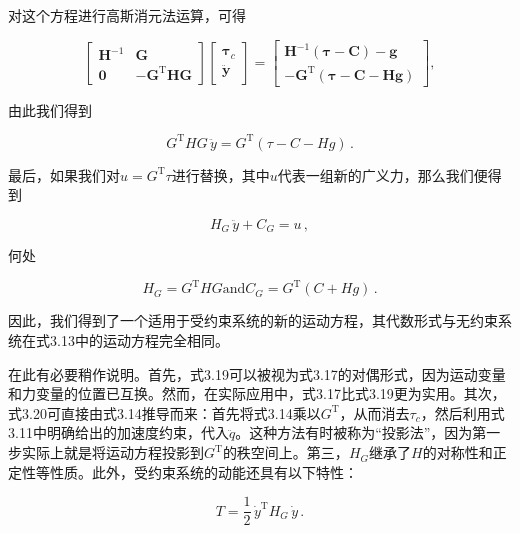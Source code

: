 \documentclass[10pt,a4paper]{book}
\theoremstyle{thmstyle} %
\theoremstyle{defstyle} %
\theoremstyle{prostyle} %
\begin{document}
对这个方程进行高斯消元法运算，可得



$$
\begin{bmatrix}\boldsymbol{H}^{-1}&\boldsymbol{G}\\\boldsymbol{0}&-\boldsymbol{G}^{\mathrm{T}}\boldsymbol{HG}\end{bmatrix}\begin{bmatrix}\boldsymbol{\tau}_{c}\\\ddot{\boldsymbol{y}}\end{bmatrix}=\begin{bmatrix}\boldsymbol{H}^{-1}(\boldsymbol{\tau}-\boldsymbol{C})-\boldsymbol{g}\\-\boldsymbol{G}^{\mathrm{T}}(\boldsymbol{\tau}-\boldsymbol{C}-\boldsymbol{Hg})\end{bmatrix},
$$



由此我们得到



$$
G ^{\mathrm { T} } H G \, \ddot { y } = G ^{\mathrm { T} } ( \tau - C - H g ) \, .
$$



最后，如果我们对$u = G^{\mathrm{T}}\tau$进行替换，其中$u$代表一组新的广义力，那么我们便得到



$$
H _ { G } \, \ddot { y } + C _ { G } = u \, ,
$$



何处



$$
H _ { G } = G ^{\mathrm { T} } H G  \mathrm { a n d }  C _ { G } = G ^{\mathrm { T} } ( C + H g ) \, .
$$



因此，我们得到了一个适用于受约束系统的新的运动方程，其代数形式与无约束系统在式3.13中的运动方程完全相同。



在此有必要稍作说明。首先，式3.19可以被视为式3.17的对偶形式，因为运动变量和力变量的位置已互换。然而，在实际应用中，式3.17比式3.19更为实用。其次，式3.20可直接由式3.14推导而来：首先将式3.14乘以$G^{\mathrm{T}}$，从而消去$\tau_{c}$，然后利用式3.11中明确给出的加速度约束，代入$\ddot{q}$。这种方法有时被称为“投影法”，因为第一步实际上就是将运动方程投影到$G^{\mathrm{T}}$的秩空间上。第三，$H_{G}$继承了$H$的对称性和正定性等性质。此外，受约束系统的动能还具有以下特性：



$$
T = \frac { 1 } { 2 } \, \dot { y } ^{\mathrm { T} } H _ { G } \, \dot { y } \, .
$$
\end{document}
